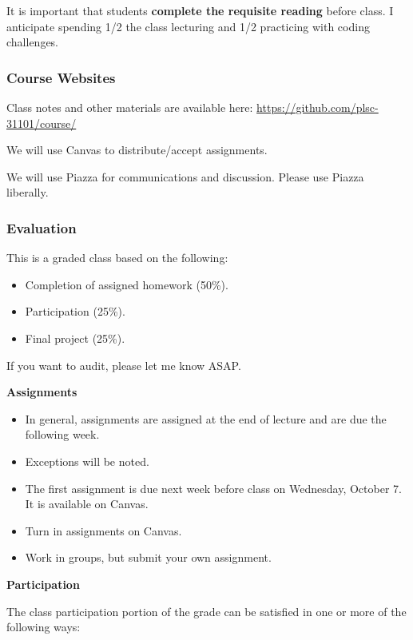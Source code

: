 \documentclass[]{book}
\providecommand{\tightlist}{%
  \setlength{\itemsep}{0pt}\setlength{\parskip}{0pt}}
\begin{document}
It is important that students \textbf{complete the requisite reading}
before class. I anticipate spending 1/2 the class lecturing and 1/2
practicing with coding challenges.

\subsubsection*{Course Websites}\label{course-websites}

Class notes and other materials are available here:
\url{https://github.com/plsc-31101/course/}

We will use Canvas to distribute/accept assignments.

We will use Piazza for communications and discussion. Please use Piazza
liberally.

\subsubsection*{Evaluation}\label{evaluation}

This is a graded class based on the following:

\begin{itemize}
\tightlist
\item
  Completion of assigned homework (50\%).
\item
  Participation (25\%).
\item
  Final project (25\%).
\end{itemize}

If you want to audit, please let me know ASAP.

\textbf{Assignments}

\begin{itemize}
\tightlist
\item
  In general, assignments are assigned at the end of lecture and are due
  the following week.
\item
  Exceptions will be noted.
\item
  The first assignment is due next week before class on Wednesday,
  October 7. It is available on Canvas.
\item
  Turn in assignments on Canvas.
\item
  Work in groups, but submit your own assignment.
\end{itemize}

\textbf{Participation}

The class participation portion of the grade can be satisfied in one or
more of the following ways:
\end{document}
